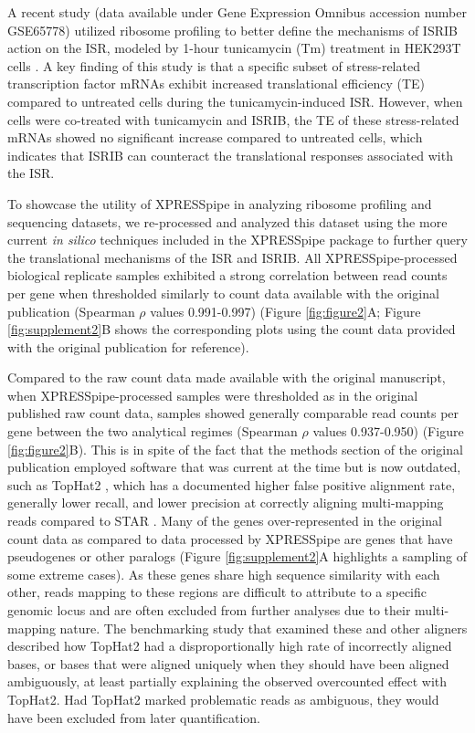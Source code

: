 \documentclass[10pt, oneside]{article}
\begin{document}
A recent study (data available under Gene Expression Omnibus accession number GSE65778) utilized ribosome profiling to better define the mechanisms of ISRIB action on the ISR, modeled by 1-hour tunicamycin (Tm) treatment in HEK293T cells \cite{isrib_riboseq}. A key finding of this study is that a specific subset of stress-related transcription factor mRNAs exhibit increased translational efficiency (TE) compared to untreated cells during the tunicamycin-induced ISR. However, when cells were co-treated with tunicamycin and ISRIB, the TE of these stress-related mRNAs showed no significant increase compared to untreated cells, which indicates that ISRIB can counteract the translational responses associated with the ISR. \par

To showcase the utility of XPRESSpipe in analyzing ribosome profiling and sequencing datasets, we re-processed and analyzed this dataset using the more current \textit{in silico} techniques included in the XPRESSpipe package to further query the translational mechanisms of the ISR and ISRIB. All XPRESSpipe-processed biological replicate samples exhibited a strong correlation between read counts per gene when thresholded similarly to count data available with the original publication (Spearman $\rho$ values 0.991-0.997) (Figure \ref{fig:figure2}A; Figure \ref{fig:supplement2}B shows the corresponding plots using the count data provided with the original publication for reference). \par

Compared to the raw count data made available with the original manuscript, when XPRESSpipe-processed samples were thresholded as in the original published raw count data, samples showed generally comparable read counts per gene between the two analytical regimes (Spearman $\rho$ values 0.937-0.950) (Figure \ref{fig:figure2}B). This is in spite of the fact that the methods section of the original publication employed software that was current at the time but is now outdated, such as TopHat2 \cite{tophat2}, which has a documented higher false positive alignment rate, generally lower recall, and lower precision at correctly aligning multi-mapping reads compared to STAR \cite{alignment_benchmark, star}. Many of the genes over-represented in the original count data as compared to data processed by XPRESSpipe are genes that have pseudogenes or other paralogs (Figure \ref{fig:supplement2}A highlights a sampling of some extreme cases). As these genes share high sequence similarity with each other, reads mapping to these regions are difficult to attribute to a specific genomic locus and are often excluded from further analyses due to their multi-mapping nature. The benchmarking study \cite{alignment_benchmark} that examined these and other aligners described how TopHat2 had a disproportionally high rate of incorrectly aligned bases, or bases that were aligned uniquely when they should have been aligned ambiguously, at least partially explaining the observed overcounted effect with TopHat2. Had TopHat2 marked problematic reads as ambiguous, they would have been excluded from later quantification. \par
\end{document}
